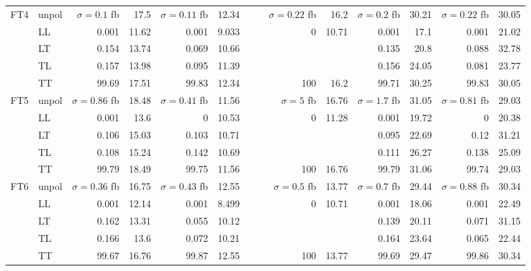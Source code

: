 \begin{table}[H]
{\begin{tabular}{llrrrrrrrrrrrr}
\midrule
\multirow{5}{*}{FT4}
 & unpol & $\sigma = \num{0.1}$ fb & \num{17.5} & $\sigma = \num{0.11}$ fb & \num{12.34} &  &  & $\sigma = \num{0.22}$ fb & \num{16.2} & $\sigma = \num{0.2}$ fb & \num{30.21} & $\sigma = \num{0.22}$ fb & \num{30.05} \\
 & LL & \num{0.001} & \num{11.62} & \num{0.001} & \num{9.033} &  &  & \num{0} & \num{10.71} & \num{0.001} & \num{17.1} & \num{0.001} & \num{21.02} \\
 & LT & \num{0.154} & \num{13.74} & \num{0.069} & \num{10.66} &  &  &  &  & \num{0.135} & \num{20.8} & \num{0.088} & \num{32.78} \\
 & TL & \num{0.157} & \num{13.98} & \num{0.095} & \num{11.39} &  &  &  &  & \num{0.156} & \num{24.05} & \num{0.081} & \num{23.77} \\
 & TT & \num{99.69} & \num{17.51} & \num{99.83} & \num{12.34} &  &  & \num{100} & \num{16.2} & \num{99.71} & \num{30.25} & \num{99.83} & \num{30.05} \\
\midrule
\multirow{5}{*}{FT5}
 & unpol & $\sigma = \num{0.86}$ fb & \num{18.48} & $\sigma = \num{0.41}$ fb & \num{11.56} &  &  & $\sigma = \num{5}$ fb & \num{16.76} & $\sigma = \num{1.7}$ fb & \num{31.05} & $\sigma = \num{0.81}$ fb & \num{29.03} \\
 & LL & \num{0.001} & \num{13.6} & \num{0} & \num{10.53} &  &  & \num{0} & \num{11.28} & \num{0.001} & \num{19.72} & \num{0} & \num{20.38} \\
 & LT & \num{0.106} & \num{15.03} & \num{0.103} & \num{10.71} &  &  &  &  & \num{0.095} & \num{22.69} & \num{0.12} & \num{31.21} \\
 & TL & \num{0.108} & \num{15.24} & \num{0.142} & \num{10.69} &  &  &  &  & \num{0.111} & \num{26.27} & \num{0.138} & \num{25.09} \\
 & TT & \num{99.79} & \num{18.49} & \num{99.75} & \num{11.56} &  &  & \num{100} & \num{16.76} & \num{99.79} & \num{31.06} & \num{99.74} & \num{29.03} \\
\midrule
\multirow{5}{*}{FT6}
 & unpol & $\sigma = \num{0.36}$ fb & \num{16.75} & $\sigma = \num{0.43}$ fb & \num{12.55} &  &  & $\sigma = \num{0.5}$ fb & \num{13.77} & $\sigma = \num{0.7}$ fb & \num{29.44} & $\sigma = \num{0.88}$ fb & \num{30.34} \\
 & LL & \num{0.001} & \num{12.14} & \num{0.001} & \num{8.499} &  &  & \num{0} & \num{10.71} & \num{0.001} & \num{18.06} & \num{0.001} & \num{22.49} \\
 & LT & \num{0.162} & \num{13.31} & \num{0.055} & \num{10.12} &  &  &  &  & \num{0.139} & \num{20.11} & \num{0.071} & \num{31.15} \\
 & TL & \num{0.166} & \num{13.6} & \num{0.072} & \num{10.21} &  &  &  &  & \num{0.164} & \num{23.64} & \num{0.065} & \num{22.44} \\
 & TT & \num{99.67} & \num{16.76} & \num{99.87} & \num{12.55} &  &  & \num{100} & \num{13.77} & \num{99.69} & \num{29.47} & \num{99.86} & \num{30.34} \\
\bottomrule
\end{tabular}
}%
\end{table}